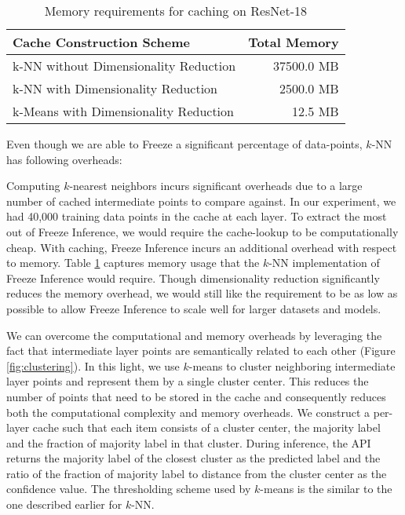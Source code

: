 \documentclass[letterpaper,twocolumn,10pt]{article}
\begin{document}
\begin{table}[t]
\vspace{-0.3cm}
  \centering
  \begin{tabular}{ l | r }
    \hline
    \textbf{Cache Construction Scheme} & \textbf{Total Memory} \\
    \hline
    k-NN without Dimensionality Reduction & 37500.0 MB \\
    \hline
    k-NN with Dimensionality Reduction & 2500.0 MB \\
    k-Means with Dimensionality Reduction & 12.5 MB \\
    \hline
  \end{tabular}
  \caption{Memory requirements for caching on ResNet-18}
  \label{tab:memory_reqs}
\end{table}

Even though we are able to Freeze a significant percentage of data-points, $k$-NN has following overheads:


     Computing $k$-nearest neighbors incurs significant overheads due to a large number of cached intermediate points to compare against. In our experiment, we had 40,000 training data points in the cache at each layer. To extract the most out of Freeze Inference, we would require the cache-lookup to be computationally cheap.
     With caching, Freeze Inference incurs an additional overhead with respect to memory. Table \ref{tab:memory_reqs} captures memory usage that the $k$-NN implementation of Freeze Inference would require. Though dimensionality reduction significantly reduces the memory overhead, we would still like the requirement to be as low as possible to allow Freeze Inference to scale well for larger datasets and models.


We can overcome the computational and memory overheads by leveraging the fact that intermediate layer points are semantically related to each other (Figure \ref{fig:clustering}). In this light, we use $k$-means to cluster neighboring intermediate layer points and represent them by a single cluster center. This reduces the number of points that need to be stored in the cache and consequently reduces both the computational complexity and memory overheads. We construct a per-layer cache such that each item consists of a cluster center, the majority label and the fraction of majority label in that cluster. During inference, the API returns the majority label of the closest cluster as the predicted label and the ratio of the fraction of majority label to distance from the cluster center as the confidence value. The thresholding scheme used by $k$-means is the similar to the one described earlier for $k$-NN.
\end{document}
